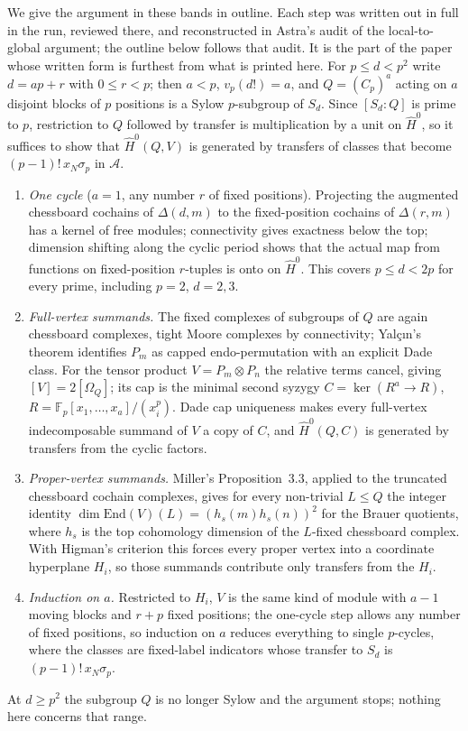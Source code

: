We give the argument in these bands in outline.  Each step was written out in full in the
run, reviewed there, and reconstructed in Astra's audit of the local-to-global argument; the
outline below follows that audit.  It is the part of the paper whose written form is furthest
from what is printed here.
For $p\le d<p^2$ write $d=ap+r$ with $0\le r<p$; then $a<p$, $v_p(d!)=a$, and
$Q=(C_p)^a$ acting on $a$ disjoint blocks of $p$ positions is a Sylow $p$-subgroup of $S_d$.
Since $[S_d:Q]$ is prime to $p$, restriction to $Q$ followed by transfer is multiplication
by a unit on $\hat H^0$, so it suffices to show that $\hat H^0(Q,V)$ is generated by
transfers of classes that become $(p-1)!\,x_N\sigma_p$ in $\mathcal A$.
\begin{enumerate}
\item \emph{One cycle} ($a=1$, any number $r$ of fixed positions).  Projecting the augmented
  chessboard cochains of $\Delta(d,m)$ to the fixed-position cochains of $\Delta(r,m)$ has a
  kernel of free modules; connectivity gives exactness below the top; dimension shifting along
  the cyclic period shows that the actual map from functions on fixed-position $r$-tuples is
  onto on $\hat H^0$.  This covers $p\le d<2p$ for every prime, including $p=2$, $d=2,3$.
\item \emph{Full-vertex summands.}  The fixed complexes of subgroups of $Q$ are again
  chessboard complexes, tight Moore complexes by connectivity; Yal\c c\i n's theorem identifies
  $P_m$ as capped endo-permutation with an explicit Dade class.  For the tensor product
  $V=P_m\otimes P_n$ the relative terms cancel, giving $[V]=2[\Omega_Q]$; its cap is the
  minimal second syzygy $C=\ker(R^a\to R)$, $R=\mathbb F_p[x_1,\dots,x_a]/(x_i^p)$.  Dade cap
  uniqueness makes every full-vertex indecomposable summand of $V$ a copy of $C$, and $\hat H^0(Q,C)$ is
  generated by transfers from the cyclic factors.
\item \emph{Proper-vertex summands.}  Miller's Proposition~3.3, applied to the truncated
  chessboard cochain complexes, gives for every non-trivial $L\le Q$ the integer identity
  $\dim\mathrm{End}(V)(L)=(h_s(m)h_s(n))^2$ for the Brauer quotients, where $h_s$ is the top
  cohomology dimension of the $L$-fixed chessboard complex.  With Higman's criterion this forces
  every proper vertex into a coordinate hyperplane $H_i$, so those summands contribute only
  transfers from the $H_i$.
\item \emph{Induction on $a$.}  Restricted to $H_i$, $V$ is the same kind of module with $a-1$
  moving blocks and $r+p$ fixed positions; the one-cycle step allows any number of fixed
  positions, so induction on $a$ reduces everything to single $p$-cycles, where the classes are
  fixed-label indicators whose transfer to $S_d$ is $(p-1)!\,x_N\sigma_p$.
\end{enumerate}
At $d\ge p^2$ the subgroup $Q$ is no longer Sylow and the argument stops; nothing here
concerns that range.

